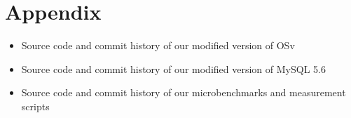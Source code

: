 \documentclass[12pt,a4paper]{book}
\begin{document}
\backmatter

\chapter{Appendix}
\blindtext
\begin{itemize}
    \item Source code and commit history of our modified version of OSv
    \item Source code and commit history of our modified version of MySQL 5.6
    \item Source code and commit history of our microbenchmarks and measurement scripts
\end{itemize}

\cleardoublepage
{}
{}
\printbibliography
\end{document}
